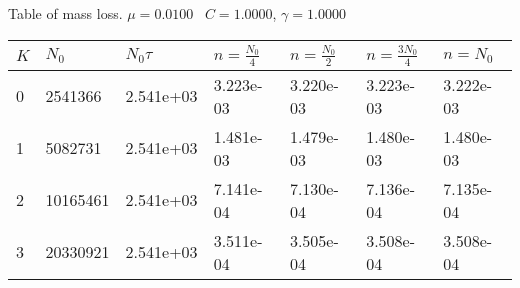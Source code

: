 \begin{center}
Table of mass loss. $\mu = 0.0100$ \, $C = 1.0000$, $\gamma = 1.0000$
  
\begin{tabular}{|p{0.8in}|p{0.8in}|p{0.8in}|p{0.8in}|p{0.8in}|p{0.8in}|p{0.8in}|} \hline
$K$ &$N_0$ &$N_0 \tau$ &$n = \frac{N_0}{4}$ &$n = \frac{N_0}{2}$ &$n = \frac{3N_0}{4}$ &$n = N_0$ \\ \hline 
0 &2541366 &2.541e+03 &3.223e-03 &3.220e-03 &3.223e-03 &3.222e-03 \\ \hline 
1 &5082731 &2.541e+03 &1.481e-03 &1.479e-03 &1.480e-03 &1.480e-03 \\ \hline 
2 &10165461 &2.541e+03 &7.141e-04 &7.130e-04 &7.136e-04 &7.135e-04 \\ \hline 
3 &20330921 &2.541e+03 &3.511e-04 &3.505e-04 &3.508e-04 &3.508e-04 \\ \hline 

\end{tabular}\\[20pt]
\end{center}
